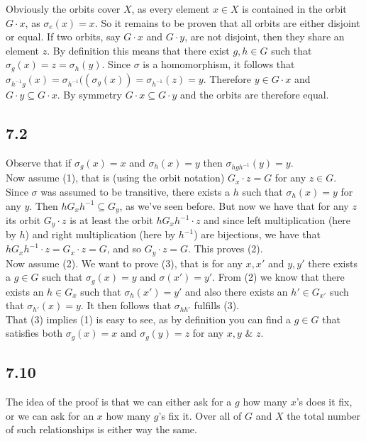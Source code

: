 \documentclass[12pt]{article}
\begin{document}
Obviously the orbits cover $X$, as every element $x \in X$ is contained in the orbit $G \cdot x$, as $\sigma_e(x) = x$. So it remains to be proven that all orbits are either disjoint or equal. If two orbits, say $G \cdot x$ and $G \cdot y$, are not disjoint, then they share an element $z$. By definition this means that there exist $g, h \in G$ such that $\sigma_g(x) = z = \sigma_h(y)$. Since $\sigma$ is a homomorphism, it follows that $\sigma_{h^{-1}g}(x) = \sigma_{h^{-1}}( (\sigma_g(x) ) = \sigma_{h^{-1}} (z) = y$. Therefore $y \in G \cdot x$ and $G \cdot y \subseteq G \cdot x$. By symmetry $G \cdot x \subseteq G \cdot y$ and the orbits are therefore equal.

\subsection*{7.2}

Observe that if $\sigma_g(x) = x$ and $\sigma_h(x) = y$ then $\sigma_{h g h^{-1}}(y) = y$. \\
Now assume (1), that is (using the orbit notation) $G_x \cdot z = G$ for any $z \in G$. \\
Since $\sigma$ was assumed to be transitive, there exists a $h$ such that $\sigma_h(x) = y$ for any $y$. Then ${h G_x h^{-1} \subseteq G_y}$, as we've seen before. But now we have that for any $z$ its orbit $G_y \cdot z$ is at least the orbit ${h G_x h^{-1} \cdot z}$ and since left multiplication (here by $h$) and right multiplication (here by $h^{-1}$) are bijections, we have that ${h G_x h^{-1} \cdot z = G_x \cdot z = G}$, and so $G_y \cdot z = G$. This proves (2). \\
Now assume (2). We want to prove (3), that is for any $x, x'$ and $y, y'$ there exists a $g \in G$ such that $\sigma_g(x) = y$ and $\sigma(x') = y'$. From (2) we know that there exists an $h \in G_x$ such that $\sigma_h(x') = y'$ and also there exists an $h' \in G_{x'}$ such that $\sigma_{h'}(x) = y$. It then follows that $\sigma_{hh'}$ fulfills (3). \\
That (3) implies (1) is easy to see, as by definition you can find a $g \in G$ that satisfies both $\sigma_g(x) = x$ and $\sigma_g(y) = z$ for any $x,y$ \& $z$.


\subsection*{7.10}

The idea of the proof is that we can either ask for a $g$ how many $x$'s does it fix, or we can ask for an $x$ how many $g$'s fix it. Over all of $G$ and $X$ the total number of such relationships is either way the same.
\end{document}
